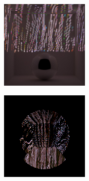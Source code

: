\begin{figure}[]
\begin{subfigure}{\textwidth}
\begin{subfigure}{0.19\textwidth}
            \centering
            \includegraphics[width=\textwidth]{images/04-experiment03/ball/wood/stats_proj.jpg}
            \caption*{}
        \end{subfigure}
        \hfill
        \begin{subfigure}{0.19\textwidth}
            \centering
            \includegraphics[width=\textwidth]{images/04-experiment03/ball/wood/pixel_im.jpg}

\end{subfigure}
\end{subfigure}
\end{figure}

